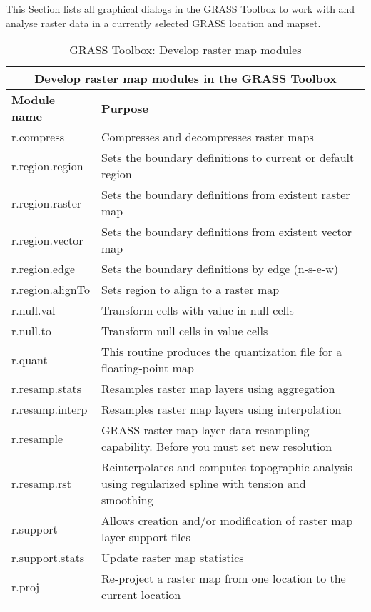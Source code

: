 This Section lists all graphical dialogs in the GRASS Toolbox to work with
and analyse raster data in a currently selected GRASS location and mapset.

\begin{table}[ht]
\centering
\caption{GRASS Toolbox: Develop raster map modules}\medskip
 \begin{tabular}{|p{4cm}|p{12cm}|}
  \hline \multicolumn{2}{|c|}{\textbf{Develop raster map modules in the GRASS
  Toolbox}} \\
  \hline \textbf{Module name} & \textbf{Purpose} \\
  \hline r.compress & Compresses and decompresses raster maps \\
  \hline r.region.region & Sets the boundary definitions to current or
  default region \\
  \hline r.region.raster & Sets the boundary definitions from existent raster
  map\\
  \hline r.region.vector & Sets the boundary definitions from existent vector map \\
  \hline r.region.edge & Sets the boundary definitions by edge (n-s-e-w) \\
  \hline r.region.alignTo & Sets region to align to a raster map\\
  \hline r.null.val & Transform cells with value in null cells\\
  \hline r.null.to & Transform null cells in value cells\\
  \hline r.quant & This routine produces the quantization file for a
  floating-point map \\
  \hline r.resamp.stats & Resamples raster map layers using aggregation \\
  \hline r.resamp.interp & Resamples raster map layers using interpolation \\
  \hline r.resample & GRASS raster map layer data resampling capability.
  Before you must set new resolution\\
  \hline r.resamp.rst & Reinterpolates and computes topographic analysis
  using regularized spline with tension and smoothing \\
  \hline r.support & Allows creation and/or modification of raster map layer
  support files\\
  \hline r.support.stats & Update raster map statistics \\
  \hline r.proj & Re-project a raster map from one location to the current
  location \\
\hline
\end{tabular}
\end{table}

